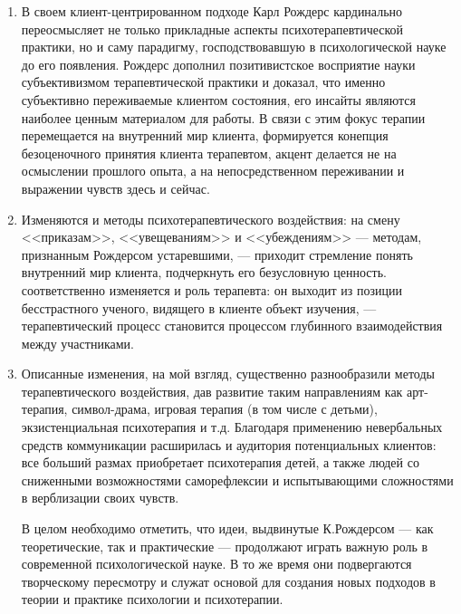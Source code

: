 \documentclass{../../common/thesisbyxetex}
\begin{document}
\begin{enumerate}

 \item В своем клиент-центрированном подходе Карл Рождерс кардинально переосмысляет не только 
прикладные аспекты психотерапевтической практики, но и саму парадигму, господствовавшую в 
психологической науке до его появления. Рождерс дополнил позитивистское восприятие науки 
субъективизмом терапевтической практики и доказал, что именно субъективно переживаемые клиентом 
состояния, его инсайты являются наиболее ценным материалом для работы. В связи с этим фокус терапии 
перемещается на внутренний мир клиента, формируется конепция безоценочного принятия клиента 
терапевтом, акцент делается не на осмыслении прошлого опыта, а на непосредственном переживании и 
выражении чувств здесь и сейчас.

\item Изменяются и методы психотерапевтического воздействия: на смену <<приказам>>, <<увещеваниям>> 
и <<убеждениям>> --- методам, признанным Рождерсом устаревшими, --- приходит стремление понять 
внутренний мир клиента, подчеркнуть его безусловную ценность. соответственно изменяется и роль 
терапевта: он выходит из позиции бесстрастного ученого, видящего в клиенте объект изучения, --- 
терапевтический процесс становится процессом глубинного взаимодействия между участниками.
\item Описанные изменения, на мой взгляд, существенно разнообразили методы терапевтического 
воздействия, дав развитие таким направлениям как арт-терапия, символ-драма, игровая терапия (в том 
числе с детьми), экзистенциальная психотерапия и т.д. Благодаря применению невербальных средств 
коммуникации расширилась  и аудитория потенциальных клиентов: все больший размах приобретает 
психотерапия детей, а также людей со сниженными возможностями саморефлексии и 
испытывающими сложностями в верблизации своих чувств.

В целом необходимо отметить, что идеи, выдвинутые К.Рождерсом --- как теоретические, так и 
практические --- продолжают играть важную роль в современной психологической науке. В то же время 
они подвергаются творческому пересмотру и служат основой для создания новых подходов в теории и 
практике психологии и психотерапии.
\end{enumerate}

\printbibliography[env=gostbibliography, sorting=ntvy]
\end{document}
